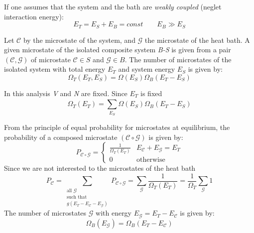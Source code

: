 \documentclass[../main/main.tex]{subfiles}
\begin{document}
If one assumes that the system and the bath are \emph{ weakly coupled} (neglet interaction energy):
\begin{equation}
  E_T = E_S + E_B = const \qquad E_B \gg E_S
\end{equation}

Let \( \mathcal{C}  \) by the microstate of the system, and \( \mathcal{G}  \) the microstate of the heat bath.
A given microstate of the isolated composite system \emph{B-S} is given from a pair \( (\mathcal{C},\mathcal{G}  ) \) of microstate \( \mathcal{C} \in S  \) and   \( \mathcal{G} \in B  \).
The number of microstates of the isolated system with total energy \( E_T \) and system energy \( E_S \)  is given by:
\begin{equation}
  \Omega _T (E_T,E_S) = \Omega (E_S) \Omega _B (E_T - E_S)
\end{equation}
\begin{remark}
In this analysis \emph{V} and \emph{N} are fixed. Since \( E_T \) is fixed
\begin{equation}
  \Omega _T (E_T) = \sum_{E_S}^{} \Omega (E_S) \Omega _B (E_T - E_S)
\end{equation}
\end{remark}
From the principle of equal probability for microstates at equilibrium, the probability of a composed microstate \( (\mathcal{C} \circ \mathcal{G}  ) \) is given by:
\begin{equation}
P_{\mathcal{C} \circ \mathcal{G}} =
  \begin{cases}
   \frac{1}{\Omega _T (E_T)} & E_{\mathcal{C} } + E_{\mathcal{G} } = E_T \\
  0 & \text{otherwise}
  \end{cases}
\end{equation}
Since we are not interested to the microstates of the heat bath
\begin{equation}
  P_{\mathcal{C} } = \sum_{\substack{ \text{all } \mathcal{G}  \\  \text{such that}  \\ g (E_T -E_{\mathcal{C} } - E_{\mathcal{G} }) } }^{} P_{\mathcal{C} \circ \mathcal{G}}   = \sum_{\mathcal{G} }^{} \frac{1}{\Omega _T (E_T)} = \frac{1}{\Omega _T} \sum_{\mathcal{G} }^{}   1
\end{equation}
The number of microstates \( \mathcal{G}  \) with energy \( E_{\mathcal{G} }= E_T - E_{\mathcal{C} } \) is given by:
\begin{equation}
  \Omega _B (E_{\mathcal{G} }) = \Omega_B (E_T - E_{\mathcal{C} })
\end{equation}
\end{document}

